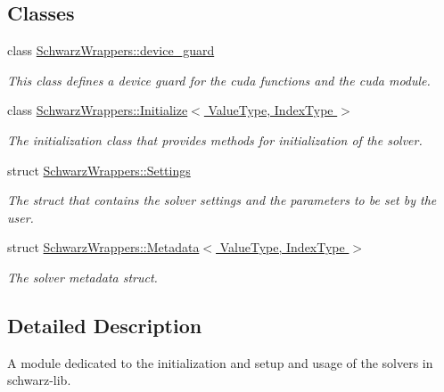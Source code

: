 \subsection*{Classes}
\begin{DoxyCompactItemize}
\item 
class \hyperlink{classSchwarzWrappers_1_1device__guard}{Schwarz\+Wrappers\+::device\+\_\+guard}
\begin{DoxyCompactList}\small\item\em This class defines a device guard for the cuda functions and the cuda module. \end{DoxyCompactList}\item 
class \hyperlink{classSchwarzWrappers_1_1Initialize}{Schwarz\+Wrappers\+::\+Initialize$<$ Value\+Type, Index\+Type $>$}
\begin{DoxyCompactList}\small\item\em The initialization class that provides methods for initialization of the solver. \end{DoxyCompactList}\item 
struct \hyperlink{structSchwarzWrappers_1_1Settings}{Schwarz\+Wrappers\+::\+Settings}
\begin{DoxyCompactList}\small\item\em The struct that contains the solver settings and the parameters to be set by the user. \end{DoxyCompactList}\item 
struct \hyperlink{structSchwarzWrappers_1_1Metadata}{Schwarz\+Wrappers\+::\+Metadata$<$ Value\+Type, Index\+Type $>$}
\begin{DoxyCompactList}\small\item\em The solver metadata struct. \end{DoxyCompactList}\end{DoxyCompactItemize}


\subsection{Detailed Description}
A module dedicated to the initialization and setup and usage of the solvers in schwarz-\/lib. 

